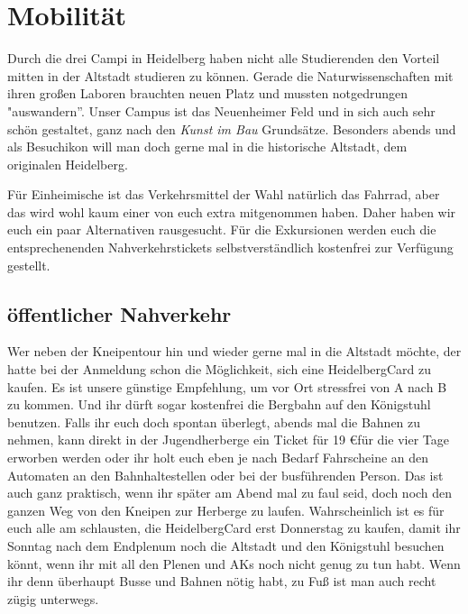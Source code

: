 \section{Mobilität}
Durch die drei Campi in Heidelberg haben nicht alle Studierenden den Vorteil mitten in der Altstadt studieren zu können. Gerade die Naturwissenschaften mit ihren großen Laboren brauchten neuen Platz und mussten notgedrungen "auswandern''. Unser Campus ist das Neuenheimer Feld und in sich auch sehr schön gestaltet, ganz nach den \textit{Kunst im Bau} Grundsätze. Besonders abends und als Besuchikon will man doch gerne mal in die historische Altstadt, dem originalen Heidelberg.

Für Einheimische ist das Verkehrsmittel der Wahl natürlich das Fahrrad, aber das wird wohl kaum einer von euch extra mitgenommen haben. Daher haben wir euch ein paar Alternativen  rausgesucht.
Für die Exkursionen werden euch die entsprechenenden Nahverkehrstickets selbstverständlich kostenfrei zur Verfügung gestellt.

\subsection{öffentlicher Nahverkehr}
Wer neben der Kneipentour hin und wieder gerne mal in die Altstadt möchte, der hatte bei     der Anmeldung schon die Möglichkeit, sich eine HeidelbergCard zu kaufen. Es ist unsere günstige Empfehlung, um vor Ort stressfrei von A nach B zu kommen. Und ihr dürft sogar kostenfrei die Bergbahn auf den Königstuhl benutzen. Falls ihr euch doch spontan überlegt, abends mal die Bahnen zu nehmen, kann direkt in der Jugendherberge ein Ticket für 19 \euro für die vier Tage erworben werden oder ihr holt euch eben je nach Bedarf Fahrscheine an den Automaten an den Bahnhaltestellen oder bei der busführenden Person. Das ist auch ganz praktisch, wenn ihr später am Abend mal zu faul seid, doch noch den ganzen Weg von den Kneipen zur Herberge zu laufen. Wahrscheinlich ist es für euch alle am schlausten, die HeidelbergCard erst Donnerstag zu kaufen, damit ihr Sonntag nach dem Endplenum noch die Altstadt und den Königstuhl besuchen könnt, wenn ihr mit all den Plenen und AKs noch nicht genug zu tun habt. Wenn ihr denn überhaupt Busse und Bahnen nötig habt, zu Fuß ist man auch recht zügig unterwegs.


